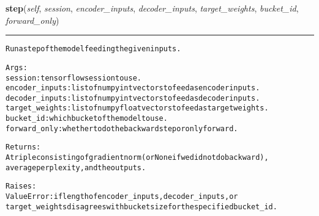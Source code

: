     \label{Chatbot:seq2seq_model:Seq2SeqModel:step}

    \vspace{0.5ex}

\hspace{.8\funcindent}\begin{boxedminipage}{\funcwidth}

    \raggedright \textbf{step}(\textit{self}, \textit{session}, \textit{encoder\_inputs}, \textit{decoder\_inputs}, \textit{target\_weights}, \textit{bucket\_id}, \textit{forward\_only})

    \vspace{-1.5ex}

    \rule{\textwidth}{0.5\fboxrule}
\setlength{\parskip}{2ex}
\begin{alltt}
Run a step of the model feeding the given inputs.

Args:
  session: tensorflow session to use.
  encoder\_inputs: list of numpy int vectors to feed as encoder inputs.
  decoder\_inputs: list of numpy int vectors to feed as decoder inputs.
  target\_weights: list of numpy float vectors to feed as target weights.
  bucket\_id: which bucket of the model to use.
  forward\_only: whether to do the backward step or only forward.

Returns:
  A triple consisting of gradient norm (or None if we did not do backward),
  average perplexity, and the outputs.

Raises:
  ValueError: if length of encoder\_inputs, decoder\_inputs, or
    target\_weights disagrees with bucket size for the specified bucket\_id.
\end{alltt}

\setlength{\parskip}{1ex}
    \end{boxedminipage}

    \label{Chatbot:seq2seq_model:Seq2SeqModel:get_batch}

    \vspace{0.5ex}


